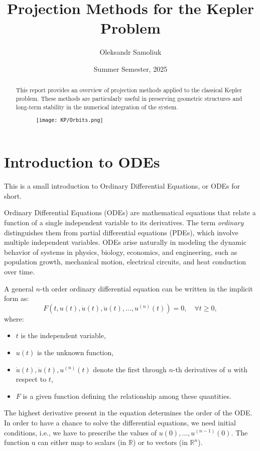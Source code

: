 \documentclass[11pt]{article}
\title{\textbf{Projection Methods for the Kepler Problem}}
\author{Oleksandr Samoliuk}
\date{Summer Semester, 2025}
\begin{document}
\maketitle %

\begin{abstract}
This report provides an overview of projection methods applied to the classical Kepler problem. These methods are particularly useful in preserving geometric structures and long-term stability in the numerical integration of the system.

\begin{figure}[H]
    \centering
    \texttt{[image: KP/Orbits.png]}
\end{figure}


\end{abstract}

\newpage
\tableofcontents %

\newpage
\section{Introduction to ODEs}
This is a small introduction to Ordinary Differential Equations, or ODEs for short.

Ordinary Differential Equations (ODEs) are mathematical equations that relate a function of a single independent variable to its derivatives. The term \textit{ordinary} distinguishes them from partial differential equations (PDEs), which involve multiple independent variables. ODEs arise naturally in modeling the dynamic behavior of systems in physics, biology, economics, and engineering, such as population growth, mechanical motion, electrical circuits, and heat conduction over time.

A general $n$-th order ordinary differential equation can be written in the implicit form as:
\[
F\left(t, u(t), \dot u(t), \ddot u(t), \dots, u^{(n)}(t)\right) = 0, \quad \forall t \ge 0,
\]
where:
\begin{itemize}
    \item $t$ is the independent variable,
    \item $u(t)$ is the unknown function,
    \item $\dot u(t), \ddot u(t), u^{(n)}(t)$ denote the first through $n$-th derivatives of $u$ with respect to $t$,
    \item $F$ is a given function defining the relationship among these quantities.
\end{itemize}
The highest derivative present in the equation determines the order of the ODE. In order to have a chance to solve the differential equations, we need initial conditions, i.e., we have to prescribe the values of $u(0), \dots, u^{(n-1)}(0)$. The function u can either map to scalars (in $\mathbb{R}$) or to vectors (in $\mathbb{R}^n$).
\end{document}
